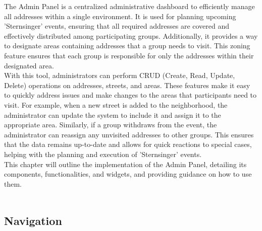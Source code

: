 \Author{\daAuthorOne}

The Admin Panel is a centralized administrative dashboard to efficiently manage all addresses within a single environment. It is used for planning upcoming 'Sternsinger' events, ensuring that all required addresses are covered and effectively distributed among participating groups. Additionally, it provides a way to designate areas containing addresses that a group needs to visit. This zoning feature ensures that each group is responsible for only the addresses within their designated area.\\

With this tool, administrators can perform CRUD (Create, Read, Update, Delete) operations on addresses, streets, and areas. These features make it easy to quickly address issues and make changes to the areas that participants need to visit. For example, when a new street is added to the neighborhood, the administrator can update the system to include it and assign it to the appropriate area. Similarly, if a group withdraws from the event, the administrator can reassign any unvisited addresses to other groups. This ensures that the data remains up-to-date and allows for quick reactions to special cases, helping with the planning and execution of 'Sternsinger' events.\\

This chapter will outline the implementation of the Admin Panel, detailing its components, functionalities, and widgets, and providing guidance on how to use them.\\\\


\subsection{Navigation}


